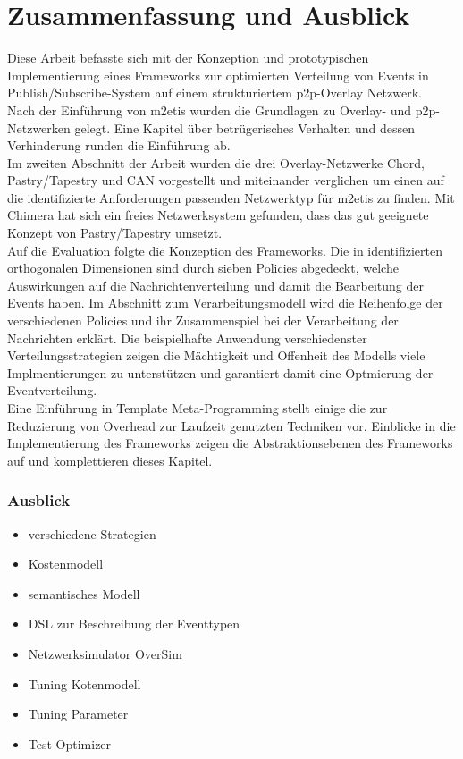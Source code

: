\chapter{Zusammenfassung und Ausblick} 
\label{chap:zus}

Diese Arbeit befasste sich mit der Konzeption und prototypischen Implementierung eines Frameworks zur optimierten Verteilung von Events in Publish/Subscribe-System auf einem strukturiertem p2p-Overlay Netzwerk.\\
Nach der Einführung von \ac{m2etis} wurden die Grundlagen zu Overlay- und p2p-Netzwerken gelegt. Eine Kapitel über betrügerisches Verhalten und dessen Verhinderung runden die Einführung ab.\\
Im zweiten Abschnitt der Arbeit wurden die drei Overlay-Netzwerke Chord, Pastry/Tapestry und CAN vorgestellt und miteinander verglichen um einen auf die identifizierte Anforderungen passenden Netzwerktyp für \ac{m2etis} zu finden. Mit Chimera hat sich ein freies Netzwerksystem gefunden, dass das gut geeignete Konzept von Pastry/Tapestry umsetzt.\\
Auf die Evaluation folgte die Konzeption des Frameworks. Die in \cite{Fischer2010Event} identifizierten orthogonalen Dimensionen sind durch sieben Policies abgedeckt, welche Auswirkungen auf die Nachrichtenverteilung und damit die Bearbeitung der Events haben. Im Abschnitt zum Verarbeitungsmodell wird die Reihenfolge der verschiedenen Policies und ihr Zusammenspiel bei der Verarbeitung der Nachrichten erklärt. Die beispielhafte Anwendung verschiedenster Verteilungsstrategien zeigen die Mächtigkeit und Offenheit des Modells viele Implmentierungen zu unterstützen und garantiert damit eine Optmierung der Eventverteilung.\\
Eine Einführung in Template Meta-Programming stellt einige die zur Reduzierung von Overhead zur Laufzeit genutzten Techniken vor. Einblicke in die Implementierung des Frameworks zeigen die Abstraktionsebenen des Frameworks auf und komplettieren dieses Kapitel.


\subsection*{Ausblick}
\begin{itemize}
\item verschiedene Strategien
\item Kostenmodell
\item semantisches Modell
\item DSL zur Beschreibung der Eventtypen
\item Netzwerksimulator OverSim \cite{Baumgart2007OverSim}
\item Tuning Kotenmodell
\item Tuning Parameter
\item Test Optimizer
\end{itemize}

